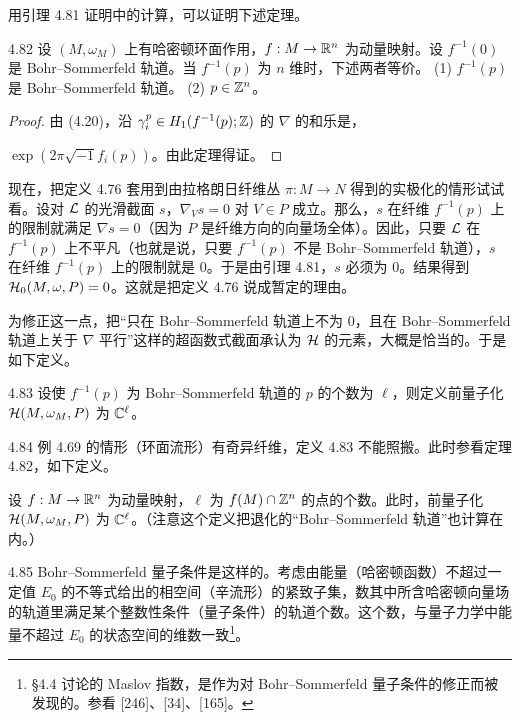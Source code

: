 用引理 4.81 证明中的计算，可以证明下述定理。

\begin{theorem*}{4.82}
  设 $(M,\omega_M)$ 上有哈密顿环面作用，$f:M\to\mathbb{R}^n$ 为动量映射。设 $f^{-1}(0)$ 是 Bohr–Sommerfeld 轨道。当 $f^{-1}(p)$ 为 $n$ 维时，下述两者等价。
  (1) $f^{-1}(p)$ 是 Bohr–Sommerfeld 轨道。
  (2) $p\in\mathbb{Z}^n$。
\end{theorem*}

\begin{proof}
  由 (4.20)，沿 $\gamma^p_i\in H_1(f^{-1}(p);\mathbb{Z})$ 的 $\nabla$ 的和乐是，

  $\exp(2\pi\sqrt{-1}f_i(p))$。由此定理得证。
\end{proof}

现在，把定义 4.76 套用到由拉格朗日纤维丛 $\pi:M\to N$ 得到的实极化的情形试试看。设对 $\mathcal{L}$ 的光滑截面 $s$，$\nabla_Vs=0$ 对 $V\in P$ 成立。那么，$s$ 在纤维 $f^{-1}(p)$ 上的限制就满足 $\nabla s=0$（因为 $P$ 是纤维方向的向量场全体）。因此，只要 $\mathcal{L}$ 在 $f^{-1}(p)$ 上不平凡（也就是说，只要 $f^{-1}(p)$ 不是 Bohr–Sommerfeld 轨道），$s$ 在纤维 $f^{-1}(p)$ 上的限制就是 0。于是由引理 4.81，$s$ 必须为 0。结果得到 $\mathcal{H}_0(M,\omega,P)=0$。这就是把定义 4.76 说成暂定的理由。

为修正这一点，把“只在 Bohr–Sommerfeld 轨道上不为 0，且在 Bohr–Sommerfeld 轨道上关于 $\nabla$ 平行”这样的超函数式截面承认为 $\mathcal{H}$ 的元素，大概是恰当的。于是如下定义。

\begin{definition}{4.83}
  设使 $f^{-1}(p)$ 为 Bohr–Sommerfeld 轨道的 $p$ 的个数为 $\ell$，则定义前量子化 $\mathcal{H}(M,\omega_M,P)$ 为 $\mathbb{C}^\ell$。
\end{definition}

\begin{remark}{4.84}
  例 4.69 的情形（环面流形）有奇异纤维，定义 4.83 不能照搬。此时参看定理 4.82，如下定义。

  设 $f:M\to\mathbb{R}^n$ 为动量映射，$\ell$ 为 $f(M)\cap\mathbb{Z}^n$ 的点的个数。此时，前量子化 $\mathcal{H}(M,\omega_M,P)$ 为 $\mathbb{C}^\ell$。（注意这个定义把退化的“Bohr–Sommerfeld 轨道”也计算在内。）
\end{remark}

\begin{remark}{4.85}
  Bohr–Sommerfeld 量子条件是这样的。考虑由能量（哈密顿函数）不超过一定值 $E_0$ 的不等式给出的相空间（辛流形）的紧致子集，数其中所含哈密顿向量场的轨道里满足某个整数性条件（量子条件）的轨道个数。这个数，与量子力学中能量不超过 $E_0$ 的状态空间的维数一致\footnote{§4.4 讨论的 Maslov 指数，是作为对 Bohr–Sommerfeld 量子条件的修正而被发现的。参看 [246]、[34]、[165]。}。
\end{remark}

